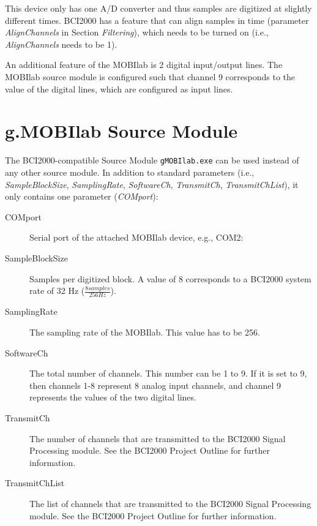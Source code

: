 \documentclass[letterpaper, oneside, 12pt]{article}
\newcommand{\ie}{i.e.,}
\begin{document}
This device only has one A/D converter and 
thus samples are digitized at slightly different times. BCI2000 has a feature 
that can align samples in time (parameter \emph{AlignChannels} in Section 
\emph{Filtering}), which needs to be turned on (i.e., \emph{AlignChannels} needs 
to be 1).

An additional feature of the MOBIlab is 2 digital input/output lines. The MOBIlab source module is configured such that channel 9 corresponds to the value of the digital lines, 
which are configured as input lines.

\section{g.MOBIlab Source Module}

The BCI2000-compatible Source Module \texttt{gMOBIlab.exe} can be used instead of 
any other source module. In addition to standard parameters (\ie{} 
\emph{SampleBlockSize}, \emph{SamplingRate}, \emph{SoftwareCh}, 
\emph{TransmitCh}, \emph{TransmitChList}), it only contains one
parameter (\emph{COMport}):

\begin{description}
 \item [COMport]           Serial port of the attached MOBIlab device, e.g., COM2: 
 \item [SampleBlockSize]   Samples per digitized block. A value of 8 corresponds to
                           a BCI2000 system rate of 32 Hz ($\frac{8 samples}{256 Hz}$).
 \item [SamplingRate]      The sampling rate of the MOBIlab. This value has to be 256.
 \item [SoftwareCh]        The total number of channels. This number can be 1 to 9.
                                      If it is set to 9, then channels 1-8 represent 8 analog input
                                        channels, and channel 9 represents the values of the two 
                                       digital lines.
 \item [TransmitCh]        The number of channels that are transmitted to the BCI2000 
                           Signal Processing module. See the BCI2000 Project
                           Outline for further information.
 \item [TransmitChList]    The list of channels that are transmitted to the BCI2000 
                           Signal Processing module. See the BCI2000 Project
                           Outline for further information.                                                                        
\end{description}
\end{document}
